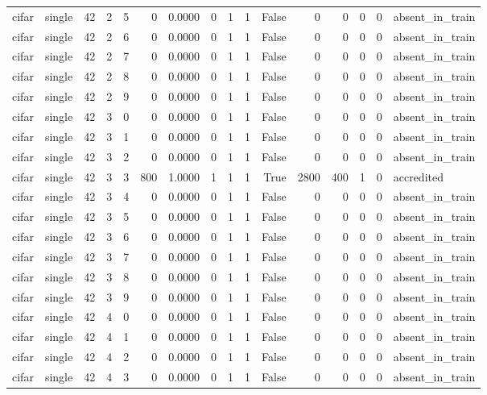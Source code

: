 \begin{tabular}{llrrrrrrrrrrrrrl}
cifar & single & 42 & 2 & 5 & 0 & 0.0000 & 0 & 1 & 1 & False & 0 & 0 & 0 & 0 & absent\_in\_train \\
cifar & single & 42 & 2 & 6 & 0 & 0.0000 & 0 & 1 & 1 & False & 0 & 0 & 0 & 0 & absent\_in\_train \\
cifar & single & 42 & 2 & 7 & 0 & 0.0000 & 0 & 1 & 1 & False & 0 & 0 & 0 & 0 & absent\_in\_train \\
cifar & single & 42 & 2 & 8 & 0 & 0.0000 & 0 & 1 & 1 & False & 0 & 0 & 0 & 0 & absent\_in\_train \\
cifar & single & 42 & 2 & 9 & 0 & 0.0000 & 0 & 1 & 1 & False & 0 & 0 & 0 & 0 & absent\_in\_train \\
cifar & single & 42 & 3 & 0 & 0 & 0.0000 & 0 & 1 & 1 & False & 0 & 0 & 0 & 0 & absent\_in\_train \\
cifar & single & 42 & 3 & 1 & 0 & 0.0000 & 0 & 1 & 1 & False & 0 & 0 & 0 & 0 & absent\_in\_train \\
cifar & single & 42 & 3 & 2 & 0 & 0.0000 & 0 & 1 & 1 & False & 0 & 0 & 0 & 0 & absent\_in\_train \\
cifar & single & 42 & 3 & 3 & 800 & 1.0000 & 1 & 1 & 1 & True & 2800 & 400 & 1 & 0 & accredited \\
cifar & single & 42 & 3 & 4 & 0 & 0.0000 & 0 & 1 & 1 & False & 0 & 0 & 0 & 0 & absent\_in\_train \\
cifar & single & 42 & 3 & 5 & 0 & 0.0000 & 0 & 1 & 1 & False & 0 & 0 & 0 & 0 & absent\_in\_train \\
cifar & single & 42 & 3 & 6 & 0 & 0.0000 & 0 & 1 & 1 & False & 0 & 0 & 0 & 0 & absent\_in\_train \\
cifar & single & 42 & 3 & 7 & 0 & 0.0000 & 0 & 1 & 1 & False & 0 & 0 & 0 & 0 & absent\_in\_train \\
cifar & single & 42 & 3 & 8 & 0 & 0.0000 & 0 & 1 & 1 & False & 0 & 0 & 0 & 0 & absent\_in\_train \\
cifar & single & 42 & 3 & 9 & 0 & 0.0000 & 0 & 1 & 1 & False & 0 & 0 & 0 & 0 & absent\_in\_train \\
cifar & single & 42 & 4 & 0 & 0 & 0.0000 & 0 & 1 & 1 & False & 0 & 0 & 0 & 0 & absent\_in\_train \\
cifar & single & 42 & 4 & 1 & 0 & 0.0000 & 0 & 1 & 1 & False & 0 & 0 & 0 & 0 & absent\_in\_train \\
cifar & single & 42 & 4 & 2 & 0 & 0.0000 & 0 & 1 & 1 & False & 0 & 0 & 0 & 0 & absent\_in\_train \\
cifar & single & 42 & 4 & 3 & 0 & 0.0000 & 0 & 1 & 1 & False & 0 & 0 & 0 & 0 & absent\_in\_train \\

\end{tabular}

